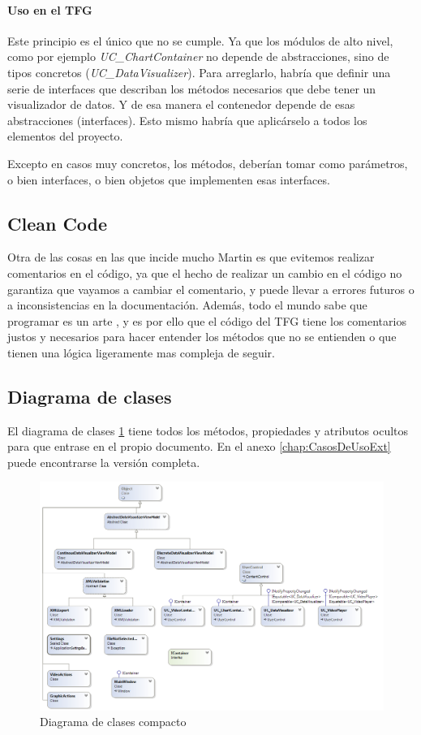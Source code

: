 \paragraph{Uso en el TFG}
Este principio es el \'unico que no se cumple. Ya que los m\'odulos de alto nivel, como por ejemplo
\emph{UC\_ChartContainer} no depende de abstracciones, sino de tipos concretos (\emph{UC\_DataVisualizer}).
Para arreglarlo, habr\'ia que definir una serie de interfaces que describan los m\'etodos necesarios que 
debe tener un visualizador de datos. Y de esa manera el contenedor depende de esas abstracciones (interfaces).
Esto mismo habr\'ia que aplic\'arselo a todos los elementos del proyecto.

Excepto en casos muy concretos, los m\'etodos, deber\'ian tomar como par\'ametros, o bien interfaces, o bien
objetos que implementen esas interfaces.

\subsection{Clean Code}
Otra de las cosas en las que incide mucho Martin es que evitemos realizar comentarios en el c\'odigo,
ya que el hecho de realizar un cambio en el c\'odigo no garantiza que vayamos a cambiar el comentario, y 
puede llevar a errores futuros o a inconsistencias en la documentaci\'on. Adem\'as, todo el mundo sabe que programar
es un arte \cite{Art:Programming}, y es por ello que el c\'odigo del TFG tiene los comentarios justos y necesarios
para hacer entender los m\'etodos que no se entienden o que tienen una l\'ogica ligeramente mas compleja de seguir.

\subsection{Diagrama de clases}
El diagrama de clases \ref{fig:ClassDiagram} tiene todos los m\'etodos, propiedades y atributos ocultos para que entrase
en el propio documento. En el anexo \ref{chap:CasosDeUsoExt} puede encontrarse la versi\'on completa.

\begin{figure}[h]
	\centering
	\includegraphics[width=1.2\linewidth]{./Figures/ClassDiagram}
	\caption[Diagrama de clases compacto]{Diagrama de clases compacto}
	\label{fig:ClassDiagram}
\end{figure}

